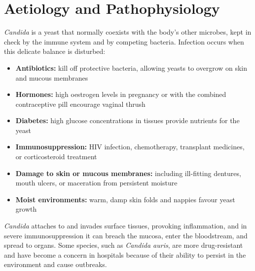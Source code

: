 \section*{Aetiology and Pathophysiology}
\textit{Candida} is a yeast that normally coexists with the body's other microbes, kept in check by the immune system and by competing bacteria. Infection occurs when this delicate balance is disturbed:
\begin{itemize}
    \item \textbf{Antibiotics:} kill off protective bacteria, allowing yeasts to overgrow on skin and mucous membranes
    \item \textbf{Hormones:} high oestrogen levels in pregnancy or with the combined contraceptive pill encourage vaginal thrush
    \item \textbf{Diabetes:} high glucose concentrations in tissues provide nutrients for the yeast
    \item \textbf{Immunosuppression:} HIV infection, chemotherapy, transplant medicines, or corticosteroid treatment
    \item \textbf{Damage to skin or mucous membranes:} including ill-fitting dentures, mouth ulcers, or maceration from persistent moisture
    \item \textbf{Moist environments:} warm, damp skin folds and nappies favour yeast growth
\end{itemize}
\textit{Candida} attaches to and invades surface tissues, provoking inflammation, and in severe immunosuppression it can breach the mucosa, enter the bloodstream, and spread to organs. Some species, such as \textit{Candida auris}, are more drug-resistant and have become a concern in hospitals because of their ability to persist in the environment and cause outbreaks.

